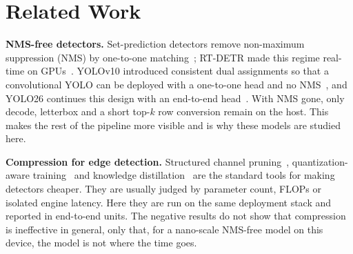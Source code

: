 \section{Related Work}
\label{sec:related}

\textbf{NMS-free detectors.}
Set-prediction detectors remove non-maximum suppression (NMS) by
one-to-one matching~\cite{carion2020detr}; RT-DETR made this regime
real-time on GPUs~\cite{zhao2024rtdetr}. YOLOv10 introduced consistent dual
assignments so that a convolutional YOLO can be deployed with a
one-to-one head and no NMS~\cite{wang2024yolov10}, and YOLO26 continues
this design with an end-to-end head~\cite{jocher2026yolo26,ultralytics2026yolo26}. With NMS
gone, only decode, letterbox and a short top-$k$ row conversion remain
on the host. This makes the rest of the pipeline more visible and is
why these models are studied here.

\textbf{Compression for edge detection.}
Structured channel pruning~\cite{li2017pruning,fang2023depgraph},
quantization-aware training~\cite{jacob2018quantization} and knowledge
distillation~\cite{hinton2015distilling} are the standard tools for
making detectors cheaper. They are usually judged by parameter count,
FLOPs or isolated engine latency. Here they are run on the same
deployment stack and reported in end-to-end units. The negative
results do not show that compression is ineffective in general, only
that, for a nano-scale NMS-free model on this device, the model is not
where the time goes.

